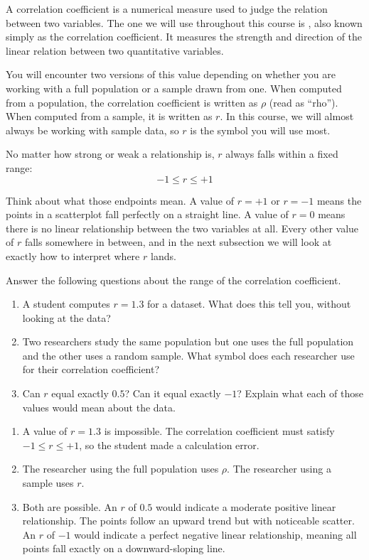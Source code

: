 A correlation coefficient is a numerical measure used to judge the
relation between two variables. The one we will use throughout this
course is ,
also known simply as the correlation coefficient. It measures the
strength and direction of the linear relation between two quantitative
variables.

You will encounter two versions of this value depending on whether you
are working with a full population or a sample drawn from one. When
computed from a population, the correlation coefficient is written as
$\rho$ (read as ``rho''). When computed from a sample, it is written
as $r$. In this course, we will almost always be working with sample
data, so $r$ is the symbol you will use most.

No matter how strong or weak a relationship is, $r$ always falls within
a fixed range:
\[
-1 \leq r \leq +1
\]

Think about what those endpoints mean. A value of $r = +1$ or $r = -1$
means the points in a scatterplot fall perfectly on a straight line.
A value of $r = 0$ means there is no linear relationship between the
two variables at all. Every other value of $r$ falls somewhere in
between, and in the next subsection we will look at exactly how to
interpret where $r$ lands.

\begin{Exercise}[title={Boundaries of $r$}, label={ex:rbounds}]
Answer the following questions about the range of the correlation
coefficient.
\begin{enumerate}
    \item A student computes $r = 1.3$ for a dataset. What does this
    tell you, without looking at the data?
    \item Two researchers study the same population but one uses the
    full population and the other uses a random sample. What symbol
    does each researcher use for their correlation coefficient?
    \item Can $r$ equal exactly $0.5$? Can it equal exactly $-1$?
    Explain what each of those values would mean about the data.
\end{enumerate}
\end{Exercise}

\begin{Answer}[ref={ex:rbounds}]
\begin{enumerate}
    \item A value of $r = 1.3$ is impossible. The correlation
    coefficient must satisfy $-1 \leq r \leq +1$, so the student
    made a calculation error.
    \item The researcher using the full population uses $\rho$. The
    researcher using a sample uses $r$.
    \item Both are possible. An $r$ of $0.5$ would indicate a moderate
    positive linear relationship. The points follow an upward
    trend but with noticeable scatter. An $r$ of $-1$ would indicate
    a perfect negative linear relationship, meaning all points fall
    exactly on a downward-sloping line.
\end{enumerate}
\end{Answer}

